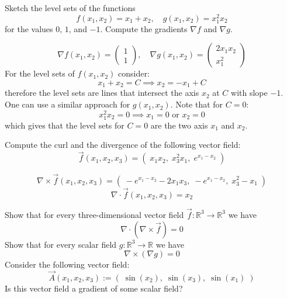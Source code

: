 \documentclass[11pt]{article}
\begin{document}

\begin{exercise}
	Sketch the level sets of the functions 
    \[
        f(x_1,x_2) = x_1 + x_2, \quad g(x_1,x_2) = x_1^2 x_2 
    \]
    for the values $0$, $1$, and $-1$.
    Compute the gradients $\nabla f$ and  $\nabla g$.
\end{exercise}

\begin{solution}
    \[
        \nabla f(x_1,x_2) = \begin{pmatrix} 1\\ 1 \end{pmatrix}, \quad \nabla g(x_1,x_2) =  \begin{pmatrix} 2x_1x_2\\ x_1^2 \end{pmatrix}
    \]
    For the level sets of $f(x_1,x_2)$ consider:
        \[
            x_1 + x_2 = C \implies x_2 = -x_1 + C
        \]
    therefore the level sets are lines that intersect the axis $x_2$ at $C$ with slope $-1$. One can use a similar approach for $g(x_1,x_2)$. Note that for $C =0$:
        \[
            x_1^2 x_2 = 0 \implies x_1 =0 \text{ or } x_2 = 0
        \]
    which gives that the level sets for $C = 0$ are the two axis $x_1$ and $x_2$. 
\end{solution}


\begin{exercise}
	Compute the curl and the divergence of the following vector field:
    \[
        \vec{f}(x_1,x_2,x_3) = \left( \; x_1 x_2, \; x_3^2 x_1,\;  e^{x_1 - x_2} \; \right)
    \]
\end{exercise}

\begin{solution}
    \[
        \nabla \times \vec{f}(x_1,x_2,x_3) = \left( \; -e^{x_1-x_2} - 2x_1x_3, \; -e^{x_1-x_2},\;  x_3^2 - x_1 \; \right)
    \]
   \[
        \nabla \cdot \vec{f}(x_1,x_2,x_3) = x_2
    \]
\end{solution}





\begin{exercise}
	Show that for every three-dimensional vector field $\vec{f} \colon \mathbb{R}^3 \to \mathbb{R}^3$ we have 
    \[
        \nabla \cdot \left( \nabla \times \vec{f} \right) = 0
    \]
    Show that for every scalar field $g \colon \mathbb{R}^3 \to \mathbb{R}$ we have 
    \[
        \nabla \times \left( \nabla g \right) = 0
    \]
    Consider the following vector field:
    \[
        \vec{A}(x_1,x_2,x_3) := \left( \; \sin(x_2),  \; \sin(x_3), \; \sin(x_1) \; \right)
    \]
    Is this vector field a gradient of some scalar field?
\end{exercise}
\end{document}
